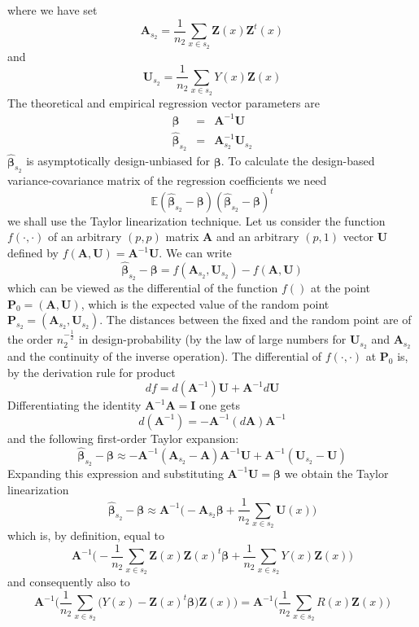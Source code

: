 \documentclass[a4paper,12pt,leqno, titlepage]{article}
\newcommand{\EX}{\mathbb{E}}
\begin{document}
 where we have set
 $$\pmb{A}_{s_2}=\frac{1}{n_2}\sum_{x\in{s_2}}\pmb{Z}(x)\pmb{Z}^t(x)$$ and
 $$\pmb{U}_{s_2}=\frac{1}{n_2}\sum_{x\in{s_2}}Y(x)\pmb{Z}(x)$$
 The theoretical and empirical regression vector parameters are
 \begin{eqnarray}\label{linearmodel3}
 \pmb{\beta}&=&\pmb{A}^{-1}\pmb{U} \nonumber \\
 \hat{\pmb{\beta}}_{s_2}&=&\pmb{A}_{s_2}^{-1}\pmb{U}_{s_2}
 \end{eqnarray}
$\hat{\pmb{\beta}}_{s_2}$ is asymptotically design-unbiased for
$\pmb{\beta}$.
 To calculate the design-based variance-covariance matrix of the regression coefficients we need
 $$\EX(\hat{\pmb{\beta}}_{s_2}-\pmb{\beta})(\hat{\pmb{\beta}}_{s_2}-\pmb{\beta})^t$$
 we shall use the Taylor linearization technique. Let us consider the function
 $f(\cdot,\cdot)$ of an arbitrary $(p,p)$ matrix $\pmb{A}$ and an arbitrary $(p,1)$
vector $\pmb{U}$ defined by
 $f(\pmb{A},\pmb{U})=\pmb{A}^{-1}\pmb{U}$. We can write
 $$\hat{\pmb{\beta}}_{s_2}-\pmb{\beta}=f(\pmb{A}_{s_2},\pmb{U}_{s_2})-f(\pmb{A},\pmb{U})$$
 which can be viewed as the differential of the function $f()$ at
 the point $\pmb{P}_0=(\pmb{A},\pmb{U})$, which is the expected value of
 the random point $\pmb{P}_{s_2}=(\pmb{A}_{s_2},\pmb{U}_{s_2})$. The distances between the fixed and the random point are of the order
 $n_2^{-\frac{1}{2}}$ in design-probability (by the law of large numbers for $\pmb{U}_{s_2}$ and $\pmb{A}_{s_2}$ and the continuity of the inverse operation). The differential of $f(\cdot,\cdot)$ at $\pmb{P}_0$ is, by the derivation
 rule for product
 $$df=d(\pmb{A}^{-1})\pmb{U}+\pmb{A}^{-1}d\pmb{U}$$
 Differentiating the identity $\pmb{A}^{-1}\pmb{A}=\pmb{I}$ one gets
 $$d(\pmb{A}^{-1})=-\pmb{A}^{-1}(d\pmb{A})\pmb{A}^{-1}$$
 and the following first-order Taylor expansion:
 $$\hat{\pmb{\beta}}_{s_2}-\pmb{\beta}\approx
 -\pmb{A}^{-1}(\pmb{A}_{s_2}-\pmb{A})\pmb{A}^{-1}\pmb{U}+\pmb{A}^{-1}(\pmb{U}_{s_2}-\pmb{U})$$
 Expanding this expression and substituting
 $\pmb{A}^{-1}\pmb{U}=\pmb{\beta}$ we obtain the Taylor
 linearization 
 $$\hat{\pmb{\beta}}_{s_2}-\pmb{\beta}\approx \pmb{A}^{-1}\Big(-\pmb{A}_{s_2}\pmb{\beta}+\frac{1}{n_2}\sum_{x\in{s_2}}\pmb{U}(x)\Big)$$
 which is, by definition, equal to
 $$\pmb{A}^{-1}\Big(-\frac{1}{n_2}\sum_{x\in{s_2}}\pmb{Z}(x)\pmb{Z}(x)^t\pmb{\beta}+\frac{1}{n_2}\sum_{x\in{s_2}}Y(x)\pmb{Z}(x)\Big)$$
 and consequently also to
 $$\pmb{A}^{-1}\Big(\frac{1}{n_2}\sum_{x\in{s_2}}\big(Y(x)-\pmb{Z}(x)^t\pmb{\beta}\big)\pmb{Z}(x)\Big)
 =\pmb{A}^{-1}\Big(\frac{1}{n_2}\sum_{x\in{s_2}}R(x)\pmb{Z}(x)\Big)$$
\end{document}
